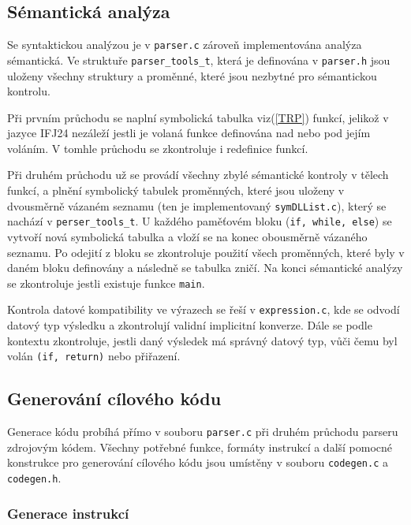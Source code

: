 \documentclass[a4paper, 11pt]{article}
\begin{document}
\subsection{Sémantická analýza}

Se syntaktickou analýzou je v \verb|parser.c| zároveň implementována analýza sémantická.
Ve struktuře \verb|parser_tools_t|, která je definována v \verb|parser.h| jsou uloženy všechny struktury a proměnné, které jsou nezbytné pro sémantickou kontrolu.

Při prvním průchodu se naplní symbolická tabulka viz(\ref{TRP}) funkcí, jelikož v jazyce IFJ24 nezáleží jestli je volaná funkce definována nad nebo pod jejím voláním. 
V tomhle průchodu se zkontroluje i redefinice funkcí.

Při druhém průchodu už se provádí všechny zbylé sémantické kontroly v tělech funkcí, a plnění symbolický tabulek proměnných, které jsou uloženy v dvousměrně vázaném seznamu (ten je implementovaný \verb|symDLList.c|), který se nachází v \verb|perser_tools_t|. 
U každého paměťovém bloku (\verb|if, while, else|) se vytvoří nová symbolická tabulka a vloží se na konec obousměrně vázaného seznamu. 
Po odejití z bloku se zkontroluje použití všech proměnných, které byly v daném bloku definovány a následně se tabulka zničí.
Na konci sémantické analýzy se zkontroluje jestli existuje funkce \verb|main|.

Kontrola datové kompatibility ve výrazech se řeší v \verb|expression.c|, kde se odvodí datový typ výsledku a zkontrolují validní implicitní konverze. 
Dále se podle kontextu zkontroluje, jestli daný výsledek má správný datový typ, vůči čemu byl volán \verb|(if, return)| nebo přiřazení.

\subsection{Generování cílového kódu}

Generace kódu probíhá přímo v souboru \verb|parser.c| při druhém průchodu parseru zdrojovým kódem. 
Všechny potřebné funkce, formáty instrukcí a další pomocné konstrukce pro generování cílového kódu jsou umístěny  v souboru \verb|codegen.c| a \verb|codegen.h|.

\subsubsection{Generace instrukcí}
\end{document}
